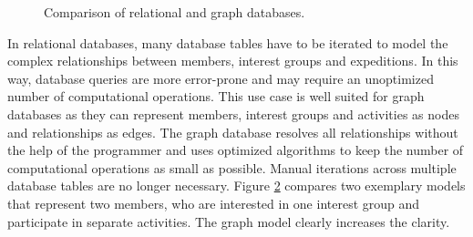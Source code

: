 \documentclass[12pt,numbers=noenddot,parskip,bibliography=totocnumbered,listof=totocnumbered,draft]{scrreprt}
\begin{document}
\begin{figure}
\bigskip

\begin{subfigure}[b]{\textwidth}
\centering
{}
\caption{}
\label{graph database}
\end{subfigure}%
\caption[Comparison of relational and graph databases]{Comparison of relational and graph databases.}
\label{databases}
\end{figure}

In relational databases, many database tables have to be iterated to model the complex relationships between members, interest groups and expeditions. In this way, database queries are more error-prone and may require an unoptimized number of computational operations.
This use case is well suited for graph databases as they can represent members, interest groups and activities as nodes and relationships as edges. The graph database resolves all relationships without the help of the programmer and uses optimized algorithms to keep the number of computational operations as small as possible. Manual iterations across multiple database tables are no longer necessary. Figure \ref{databases} compares two exemplary models that represent two members, who are interested in one interest group and participate in separate activities. The graph model clearly increases the clarity.
\end{document}
